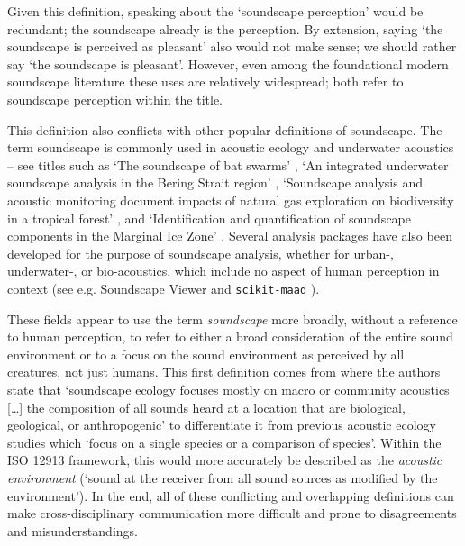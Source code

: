 Given this definition, speaking about the `soundscape perception' would be redundant; the soundscape already is the perception. By extension, saying `the soundscape is perceived as pleasant' also would not make sense; we should rather say `the soundscape is pleasant'. However, even among the foundational modern soundscape literature these uses are relatively widespread; \citet{Axelsson2010principal,Liu2014Effects} both refer to soundscape perception within the title.

This definition also conflicts with other popular definitions of soundscape. The term soundscape is commonly used in acoustic ecology and underwater acoustics -- see titles such as `The soundscape of bat swarms' \citep{Kloepper2017soundscape}, `An integrated underwater soundscape analysis in the Bering Strait region' \citep{McKenna2021integrated}, `Soundscape analysis and acoustic monitoring document impacts of natural gas exploration on biodiversity in a tropical forest' \citep{Deichmann2017Soundscape}, and `Identification and quantification of soundscape components in the Marginal Ice Zone' \citep{Geyer2016Identification}. Several analysis packages have also been developed for the purpose of soundscape analysis, whether for urban-, underwater-, or bio-acoustics, which include no aspect of human perception in context (see e.g. Soundscape Viewer \citep{Sun2020Soundscape} and \texttt{scikit-maad} \citep{Ulloa2021scikit}). 

These fields appear to use the term \emph{soundscape} more broadly, without a reference to human perception, to refer to either a broad consideration of the entire sound environment or to a focus on the sound environment as perceived by all creatures, not just humans. This first definition comes from \citet{Pijanowski2011Soundscape} where the authors state that `soundscape ecology focuses mostly on macro or community acoustics [\dots] the
composition of all sounds heard at a location that are biological, geological, or anthropogenic' to differentiate it from previous acoustic ecology studies which `focus on a single species or a comparison of species'. Within the ISO 12913 framework, this would more accurately be described as the \emph{acoustic environment} (`sound at the receiver from all sound sources as modified by the environment'). In the end, all of these conflicting and overlapping definitions can make cross-disciplinary communication more difficult and prone to disagreements and misunderstandings. 